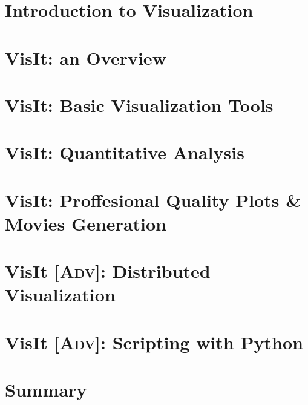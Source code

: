 \documentclass[dvipsnames]{beamer}
\providecommand{\sectionpage}{\Large\centering \bf\mediumblue\insertsection}
\begin{document}
\section{Introduction to Visualization}
\frame{\sectionpage}

\section{VisIt: an Overview}
\frame{\sectionpage}

\section{VisIt: Basic Visualization Tools}
\frame{\sectionpage}

\section{VisIt: Quantitative Analysis}
\frame{\sectionpage}

\section{VisIt: Proffesional Quality Plots \& Movies Generation}
\frame{\sectionpage}

\section{VisIt {[}\textsc{Adv}{]}: Distributed Visualization}
\frame{\sectionpage}

\section{VisIt {[}\textsc{Adv}{]}: Scripting with Python}
\frame{\sectionpage}

\section{Summary}
\frame{\sectionpage}

\end{document}
